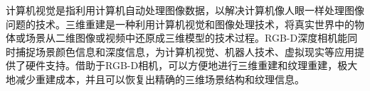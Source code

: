 




计算机视觉是指利用计算机自动处理图像数据，以解决计算机像人眼一样处理图像问题的技术。三维重建是一种利用计算机视觉和图像处理技术，将真实世界中的物体或场景从二维图像或视频中还原成三维模型的技术过程。RGB-D深度相机能同时捕捉场景颜色信息和深度信息，为计算机视觉、机器人技术、虚拟现实等应用提供了硬件支持。借助于RGB-D相机，可以方便地进行三维重建和纹理重建，极大地减少重建成本，并且可以恢复出精确的三维场景结构和纹理信息。


